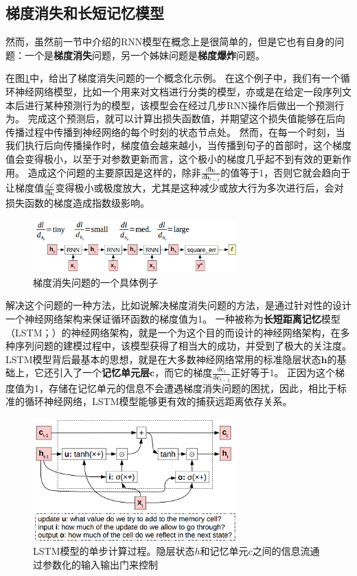\documentclass[10pt,a4paper]{ctexart}
\begin{document}
\subsection{梯度消失和长短记忆模型}
然而，虽然前一节中介绍的RNN模型在概念上是很简单的，但是它也有自身的问题：一个是\textbf{梯度消失}问题，另一个姊妹问题是\textbf{梯度爆炸}问题。

在图\ref{fig:16}中，给出了梯度消失问题的一个概念化示例。
在这个例子中，我们有一个循环神经网络模型，比如一个用来对文档进行分类的模型，亦或是在给定一段序列文本后进行某种预测行为的模型，该模型会在经过几步RNN操作后做出一个预测行为。
完成这个预测后，就可以计算出损失函数值，并期望这个损失值能够在后向传播过程中传播到神经网络的每个时刻的状态节点处。
然而，在每一个时刻，当我们执行后向传播操作时，梯度值会越来越小，当传播到句子的首部时，这个梯度值会变得极小，以至于对参数更新而言，这个极小的梯度几乎起不到有效的更新作用。
造成这个问题的主要原因是这样的，除非$\frac{d\textbf{h}_{t}}{d\textbf{h}_{t-1}}$的值等于1，否则它就会趋向于让梯度值$\frac{d\mathcal{L}}{d\textbf{h}_t}$变得极小或极度放大，尤其是这种减少或放大行为多次进行后，会对损失函数的梯度造成指数级影响。

\begin{figure}[H]
\centering
\includegraphics[width=0.7\textwidth]{fig16.png}
\caption{梯度消失问题的一个具体例子}
\label{fig:16}
\end{figure}

解决这个问题的一种方法，比如说解决梯度消失问题的方法，是通过针对性的设计一个神经网络架构来保证循环函数的梯度值为1。
一种被称为\textbf{长短距离记忆}模型（LSTM；\cite{hochreiter1997long}）的神经网络架构，就是一个为这个目的而设计的神经网络架构，在多种序列问题的建模过程中，该模型获得了相当大的成功，并受到了极大的关注度。
LSTM模型背后最基本的思想，就是在大多数神经网络常用的标准隐层状态$\textbf{h}$的基础上，它还引入了一个\textbf{记忆单元层}$\textbf{c}$，而它的梯度$\frac{d\textbf{c}_t}{d\textbf{c}_{t-1}}$正好等于1。
正因为这个梯度值为1，存储在记忆单元的信息不会遭遇梯度消失问题的困扰，因此，相比于标准的循环神经网络，LSTM模型能够更有效的捕获远距离依存关系。

\begin{figure}[H]
\centering
\includegraphics[width=0.7\textwidth]{fig17.png}
\caption{LSTM模型的单步计算过程。隐层状态\textbf{$h$}和记忆单元\textbf{$c$}之间的信息流通过参数化的输入输出门来控制}
\label{fig:17}
\end{figure}
\end{document}
